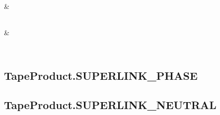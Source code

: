 \documentclass[letterpaper,10pt,english]{sphinxmanual}
\begin{document}
\begin{fulllineitems}
\begin{savenotes}
\begin{longtable}[c]{}
\\
\hline
\sphinxAtStartPar
{\hyperref[\detokenize{generated/quality_assessment.products.TapeProduct.STANDARD2:quality_assessment.products.TapeProduct.STANDARD2}]{}}
&
\sphinxAtStartPar

\\
\hline
\sphinxAtStartPar
{\hyperref[\detokenize{generated/quality_assessment.products.TapeProduct.STANDARD3:quality_assessment.products.TapeProduct.STANDARD3}]{}}
&
\sphinxAtStartPar

\\
\hline
\end{longtable}\sphinxatlongtableend\end{savenotes}


\subsection{TapeProduct.SUPERLINK\_PHASE}
\label{\detokenize{generated/quality_assessment.products.TapeProduct.SUPERLINK_PHASE:tapeproduct-superlink-phase}}\label{\detokenize{generated/quality_assessment.products.TapeProduct.SUPERLINK_PHASE::doc}}

\begin{fulllineitems}
\label{\detokenize{generated/quality_assessment.products.TapeProduct.SUPERLINK_PHASE:quality_assessment.products.TapeProduct.SUPERLINK_PHASE}}
\end{fulllineitems}



\subsection{TapeProduct.SUPERLINK\_NEUTRAL}
\label{\detokenize{generated/quality_assessment.products.TapeProduct.SUPERLINK_NEUTRAL:tapeproduct-superlink-neutral}}\label{\detokenize{generated/quality_assessment.products.TapeProduct.SUPERLINK_NEUTRAL::doc}}


\end{fulllineitems}
\end{document}
